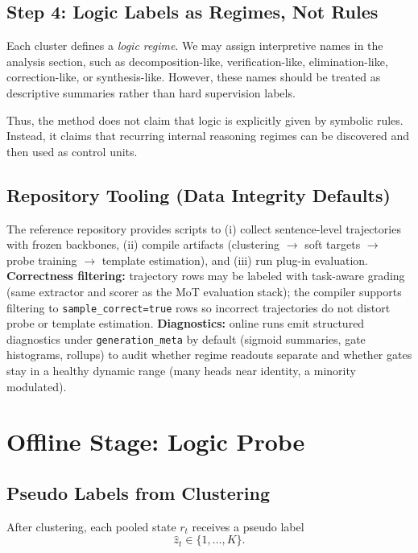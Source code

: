 \documentclass[11pt]{article}
\begin{document}
\subsection{Step 4: Logic Labels as Regimes, Not Rules}

Each cluster defines a \emph{logic regime}. We may assign interpretive names in the analysis section, such as decomposition-like, verification-like, elimination-like, correction-like, or synthesis-like. However, these names should be treated as descriptive summaries rather than hard supervision labels.

Thus, the method does not claim that logic is explicitly given by symbolic rules. Instead, it claims that recurring internal reasoning regimes can be discovered and then used as control units.

\subsection{Repository Tooling (Data Integrity Defaults)}

The reference repository provides scripts to (i) collect sentence-level trajectories with frozen backbones, (ii) compile artifacts (clustering $\rightarrow$ soft targets $\rightarrow$ probe training $\rightarrow$ template estimation), and (iii) run plug-in evaluation. \textbf{Correctness filtering:} trajectory rows may be labeled with task-aware grading (same extractor and scorer as the MoT evaluation stack); the compiler supports filtering to \texttt{sample\_correct=true} rows so incorrect trajectories do not distort probe or template estimation. \textbf{Diagnostics:} online runs emit structured diagnostics under \texttt{generation\_meta} by default (sigmoid summaries, gate histograms, rollups) to audit whether regime readouts separate and whether gates stay in a healthy dynamic range (many heads near identity, a minority modulated).

\section{Offline Stage: Logic Probe}

\subsection{Pseudo Labels from Clustering}

After clustering, each pooled state $r_t$ receives a pseudo label
\[
\hat{z}_t \in \{1,\dots,K\}.
\]
\end{document}
